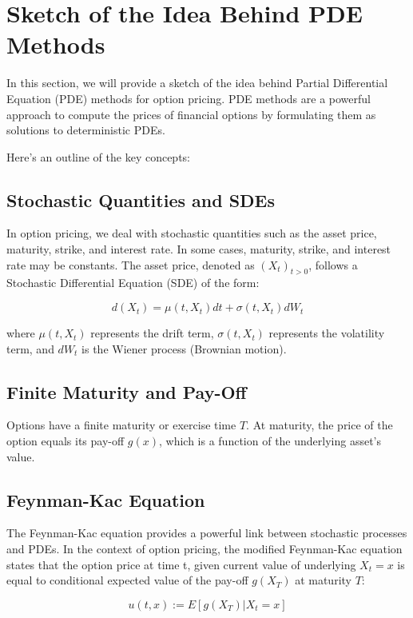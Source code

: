 \section{Sketch of the Idea Behind PDE Methods}

In this section, we will provide a sketch of the idea behind Partial Differential Equation (PDE) methods for option pricing. PDE methods are a powerful approach to compute the prices of financial options by formulating them as solutions to deterministic PDEs.

Here's an outline of the key concepts:

\subsection{Stochastic Quantities and SDEs}

In option pricing, we deal with stochastic quantities such as the asset price, maturity, strike, and interest rate. In some cases, maturity, strike, and interest rate may be constants. The asset price, denoted as ${(X_t)}_{t > 0}$, follows a Stochastic Differential Equation (SDE) of the form:

\[
d(X_t) = \mu(t, X_t) dt + \sigma(t, X_t) dW_t
\]

where $\mu(t, X_t)$ represents the drift term, $\sigma(t, X_t)$ represents the volatility term, and $dW_t$ is the Wiener process (Brownian motion).

\subsection{Finite Maturity and Pay-Off}

Options have a finite maturity or exercise time $T$. At maturity, the price of the option equals its pay-off $g(x)$, which is a function of the underlying asset's value.

\subsection{Feynman-Kac Equation}

The Feynman-Kac equation provides a powerful link between stochastic processes and PDEs. In the context of option pricing, the modified Feynman-Kac equation states that the option price at time t, given current value of underlying $X_t = x$ is equal to conditional expected value of the pay-off $g(X_T)$ at maturity $T$:

\[
u(t, x) := E[g(X_T) | X_t = x]
\]

